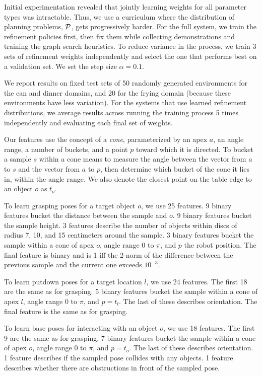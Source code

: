 Initial experimentation revealed that jointly learning weights for all
parameter types was intractable. Thus, we use a curriculum where the
distribution of planning problems, $\mathcal{P}$, gets progressively
harder. For the full system, we train the refinement policies first,
then fix them while collecting demonstrations and training the graph
search heuristics. To reduce variance in the process, we train 3 sets
of refinement weights independently and select the one that performs
best on a validation set. We set the step size $\alpha = 0.1$.

We report results on fixed test sets of 50 randomly generated
environments for the can and dinner domains, and 20 for the frying
domain (because these environments have less variation).  For the
systems that use learned refinement distributions, we average results across running the
training process 5 times independently and evaluating each final set
of weights.

Our features use the concept of a \emph{cone}, parameterized by an apex $a$,
an angle range, a number of buckets, and a point $p$ toward which it is directed.
To bucket a sample $s$ within a cone means to measure the angle between the vector from
$a$ to $s$ and the vector from $a$ to $p$, then determine which bucket of the cone
it lies in, within the angle range. We also denote the closest point on the table edge to an object $o$ as $t_{o}$.

To learn grasping poses for a target object $o$, we use 25 features.
9 binary features bucket the distance between
the sample and $o$. 9 binary features bucket the
sample height. 3 features describe the number of objects within
discs of radius 7, 10, and 15 centimeters around the sample. 3 binary
features bucket the sample within a cone of apex $o$, angle range 0 to $\pi$, and $p$
the robot position. The final feature is binary and is 1 iff the 2-norm of
the difference between the previous sample and the current one exceeds $10^{-3}$.

To learn putdown poses for a target location $l$, we use 24 features. The first
18 are the same as for grasping. 5 binary features bucket the sample within
a cone of apex $l$, angle range 0 to $\pi$, and $p = t_{l}$. The last of these describes
orientation. The final feature is the same as for grasping.

To learn base poses for interacting with an object $o$, we use 18 features. The first 9 are the same as
for grasping. 7 binary features bucket the sample within a cone of apex $o$, angle range 0 to $\pi$, and $p = t_{o}$.
The last of these describes orientation.
1 feature describes if the sampled pose collides with any objects.
1 feature describes whether there are obstructions in front of the sampled pose.

